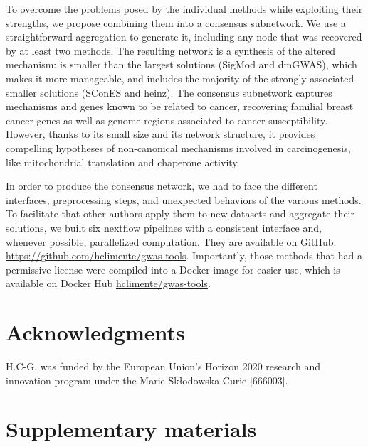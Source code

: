 \documentclass[twocolumn, 10pt]{article}
\begin{document}
To overcome the problems posed by the individual methods while exploiting their strengths, we propose combining them into a consensus subnetwork. We use a straightforward aggregation to generate it, including any node that was recovered by at least two methods. The resulting network is a synthesis of the altered mechanism: is smaller than the largest solutions (SigMod and dmGWAS), which makes it more manageable, and includes the majority of the strongly associated smaller solutions (SConES and heinz). The consensus subnetwork captures mechanisms and genes known to be related to cancer, recovering familial breast cancer genes as well as genome regions associated to cancer susceptibility. However, thanks to its small size and its network structure, it provides compelling hypotheses of non-canonical mechanisms involved in carcinogenesis, like mitochondrial translation and chaperone activity. 

In order to produce the consensus network, we had to face the different interfaces, preprocessing steps, and unexpected behaviors of the various methods. To facilitate that other authors apply them to new datasets and aggregate their solutions, we built six nextflow pipelines \cite{di_tommaso_nextflow_2017} with a consistent interface and, whenever possible, parallelized computation. They are available on GitHub: \url{https://github.com/hclimente/gwas-tools}. Importantly, those methods that had a permissive license were compiled into a Docker image for easier use, which is available on Docker Hub \href{https://hub.docker.com/r/hclimente/gwas-tools}{hclimente/gwas-tools}.

\section{Acknowledgments}
\label{sec:org7847920}

H.C-G. was funded by the European Union’s Horizon 2020 research and innovation program under the Marie Skłodowska-Curie [666003].




\clearpage
\setcounter{figure}{0}
\setcounter{section}{0}
\setcounter{table}{0}

\section*{Supplementary materials}
\label{sec:org7e6740f}
\end{document}
